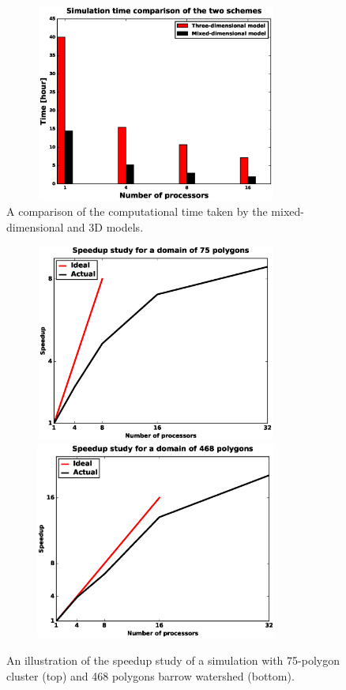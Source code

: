 \documentclass[review]{elsarticle}
\begin{document}
\begin{figure}[!htpb]
\centering
\includegraphics[height = 6.5cm, width=10cm]{figures/compare3d-lcs-speed.eps}
\caption{A comparison of the computational time taken by the mixed-dimensional and 3D models.}
\label{3d-lcs-speed}
\end{figure}


\begin{figure}[!htpb]
\centering
\includegraphics[height = 6.5cm, width=10cm]{figures/speedup-lcs-lobster.eps}
\includegraphics[height = 6.5cm, width=10cm]{figures/speedup-lcs-barrow.eps}
\caption{An illustration of the speedup study of a simulation with 75-polygon cluster (top) and 468 polygons barrow watershed (bottom).}
\label{lcs-speed}
\end{figure}
\end{document}
